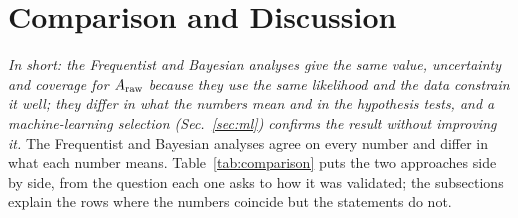 \section{Comparison and Discussion}
\label{sec:comparison}
\label{app:ext_comp}
\emph{In short: the Frequentist and Bayesian analyses give the same value, uncertainty and coverage for $A_{\mathrm{raw}}$ because they use the same likelihood and the data constrain it well; they differ in what the numbers mean and in the hypothesis tests, and a machine-learning selection (Sec.~\ref{sec:ml}) confirms the result without improving it.}
\label{sec:comparison_summary}
The Frequentist and Bayesian analyses agree on every number and differ in what each number means. Table~\ref{tab:comparison} puts the two approaches side by side, from the question each one asks to how it was validated; the subsections explain the rows where the numbers coincide but the statements do not.

